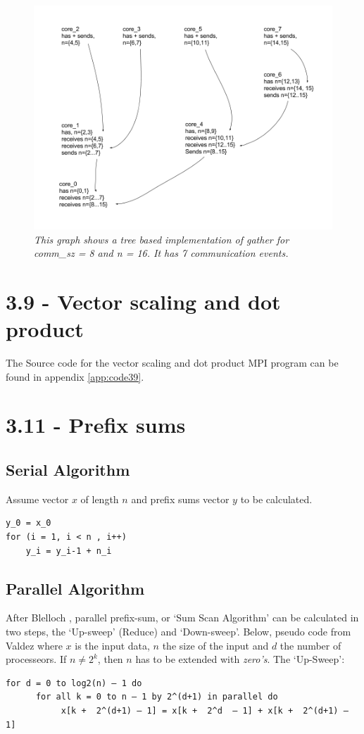 \documentclass[a4paper,11pt,twoside]{article}
\begin{document}
\begin{figure}

  \centering
  \includegraphics[width=1\textwidth]{gather.png}
  \caption{\textit{This graph shows a tree based implementation of gather for comm\_sz = 8 and n = 16. It has 7 communication events.}}
  \label{fig:gather}
\end{figure}

\section{3.9 - Vector scaling and dot product}
The Source code for the vector scaling and dot product MPI program can be found in appendix \ref{app:code39}.


\section{3.11 - Prefix sums}
\subsection*{Serial Algorithm}
Assume vector $x$ of length $n$ and prefix sums vector $y$ to be calculated.
\begin{verbatim}
y_0 = x_0
for (i = 1, i < n , i++)
    y_i = y_i-1 + n_i
\end{verbatim}

\subsection*{Parallel Algorithm}
After Blelloch \cite{blelloch1990}, parallel prefix-sum, or `Sum Scan Algorithm' can be calculated in two steps, the `Up-sweep' (Reduce) and `Down-sweep'. Below, pseudo code from Valdez \cite{valdez2012} where $x$ is the input data, $n$ the size of the input and $d$ the number of processeors. If $n \neq 2^{k}$, then $n$ has to be extended with \textit{zero's}. The `Up-Sweep':
\begin{verbatim}
for d = 0 to log2(n) – 1 do 
      for all k = 0 to n – 1 by 2^(d+1) in parallel do 
           x[k +  2^(d+1) – 1] = x[k +  2^d  – 1] + x[k +  2^(d+1) – 1]
\end{verbatim}
\end{document}
